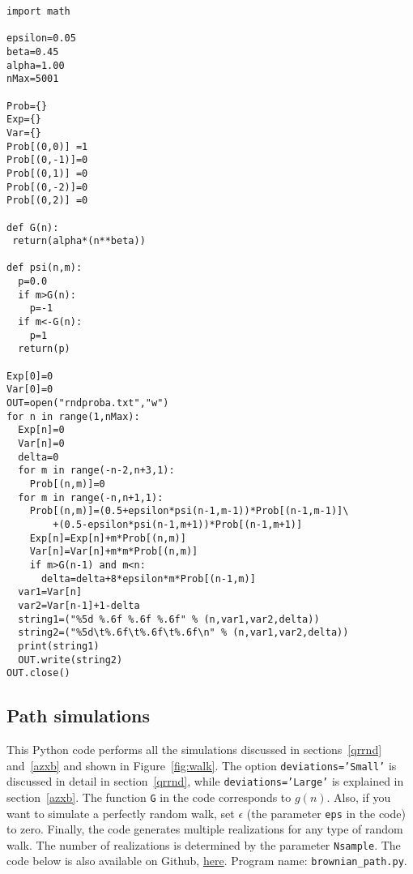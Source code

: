 \documentclass[oneside,10pt]{book}
\begin{document}

\begin{lstlisting}
import math

epsilon=0.05 
beta=0.45
alpha=1.00 
nMax=5001

Prob={}
Exp={}
Var={}
Prob[(0,0)] =1
Prob[(0,-1)]=0 
Prob[(0,1)] =0 
Prob[(0,-2)]=0 
Prob[(0,2)] =0 

def G(n):
 return(alpha*(n**beta))

def psi(n,m):
  p=0.0
  if m>G(n): 
    p=-1
  if m<-G(n):  
    p=1
  return(p)

Exp[0]=0
Var[0]=0
OUT=open("rndproba.txt","w")
for n in range(1,nMax):
  Exp[n]=0
  Var[n]=0
  delta=0
  for m in range(-n-2,n+3,1):
    Prob[(n,m)]=0
  for m in range(-n,n+1,1):
    Prob[(n,m)]=(0.5+epsilon*psi(n-1,m-1))*Prob[(n-1,m-1)]\
        +(0.5-epsilon*psi(n-1,m+1))*Prob[(n-1,m+1)]
    Exp[n]=Exp[n]+m*Prob[(n,m)]
    Var[n]=Var[n]+m*m*Prob[(n,m)]
    if m>G(n-1) and m<n: 
      delta=delta+8*epsilon*m*Prob[(n-1,m)]
  var1=Var[n]
  var2=Var[n-1]+1-delta
  string1=("%5d %.6f %.6f %.6f" % (n,var1,var2,delta))
  string2=("%5d\t%.6f\t%.6f\t%.6f\n" % (n,var1,var2,delta))
  print(string1)
  OUT.write(string2) 
OUT.close() 
\end{lstlisting}


\subsection{Path simulations}\label{paths}

This Python code performs all the simulations discussed in sections~\ref{qrrnd} and~\ref{azxb} and shown in Figure~\ref{fig:walk}. The option
 \texttt{deviations='Small'} is discussed in detail in section~\ref{qrrnd}, while \texttt{deviations='Large'} is
 explained in section~\ref{azxb}. The function \texttt{G} in the code corresponds to $g(n)$. Also, if you want to simulate a perfectly random walk, set $\epsilon$ (the parameter \texttt{eps} in the code) to zero. Finally, the code generates multiple realizations for any type of random walk. The number of realizations is determined by the parameter \texttt{Nsample}.
The code below is also available on Github, \href{https://github.com/VincentGranville/Machine-Learning/blob/main/Source\%20Code/brownian_path.py}{here}. 
Program name: \texttt{brownian\_path.py}. \\
\end{document}
